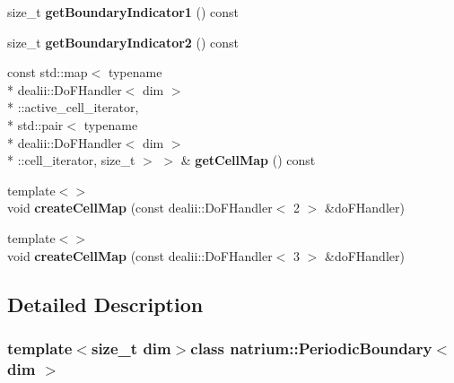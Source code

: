 \begin{DoxyCompactItemize}
\item 
\hypertarget{classnatrium_1_1PeriodicBoundary_aead325214d43693a03a5d24613f4fe14}{size\-\_\-t {\bfseries get\-Boundary\-Indicator1} () const }\label{classnatrium_1_1PeriodicBoundary_aead325214d43693a03a5d24613f4fe14}

\item 
\hypertarget{classnatrium_1_1PeriodicBoundary_af7e6f5b6028b0499df8335377156bc26}{size\-\_\-t {\bfseries get\-Boundary\-Indicator2} () const }\label{classnatrium_1_1PeriodicBoundary_af7e6f5b6028b0499df8335377156bc26}

\item 
\hypertarget{classnatrium_1_1PeriodicBoundary_a2b72df382be0d95e3c1aeebf30d2d3dc}{const std\-::map$<$ typename \\*
dealii\-::\-Do\-F\-Handler$<$ dim $>$\\*
\-::active\-\_\-cell\-\_\-iterator, \\*
std\-::pair$<$ typename \\*
dealii\-::\-Do\-F\-Handler$<$ dim $>$\\*
\-::cell\-\_\-iterator, size\-\_\-t $>$ $>$ \& {\bfseries get\-Cell\-Map} () const }\label{classnatrium_1_1PeriodicBoundary_a2b72df382be0d95e3c1aeebf30d2d3dc}

\item 
\hypertarget{classnatrium_1_1PeriodicBoundary_a020c4ee339ab6e170054c72302c42eea}{{\footnotesize template$<$$>$ }\\void {\bfseries create\-Cell\-Map} (const dealii\-::\-Do\-F\-Handler$<$ 2 $>$ \&do\-F\-Handler)}\label{classnatrium_1_1PeriodicBoundary_a020c4ee339ab6e170054c72302c42eea}

\item 
\hypertarget{classnatrium_1_1PeriodicBoundary_afa65844dfc07183155f5ba6ba56c0ebf}{{\footnotesize template$<$$>$ }\\void {\bfseries create\-Cell\-Map} (const dealii\-::\-Do\-F\-Handler$<$ 3 $>$ \&do\-F\-Handler)}\label{classnatrium_1_1PeriodicBoundary_afa65844dfc07183155f5ba6ba56c0ebf}

\end{DoxyCompactItemize}


\subsection{Detailed Description}
\subsubsection*{template$<$size\-\_\-t dim$>$class natrium\-::\-Periodic\-Boundary$<$ dim $>$}

